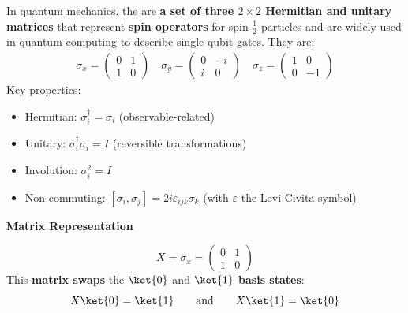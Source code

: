 \highspace
\begin{remarkbox}
   In quantum mechanics, the  are \textbf{a set of three $2 \times 2$ Hermitian and unitary matrices} that represent \textbf{spin operators} for spin-$\frac{1}{2}$ particles and are widely used in quantum computing to describe single-qubit gates. They are:
   \begin{equation*}
      \begin{array}{rcl}
         \sigma_{x} =
         \begin{pmatrix}
            0 & 1 \\
            1 & 0
         \end{pmatrix} \quad
         \sigma_{y} =
         \begin{pmatrix}
            0 & -i \\
            i & 0
         \end{pmatrix} \quad
         \sigma_{z} =
         \begin{pmatrix}
            1 & 0 \\
            0 & -1
         \end{pmatrix}
      \end{array}
   \end{equation*}
   Key properties:
   \begin{itemize}
      \item Hermitian: $\sigma_{i}^{\dagger} = \sigma_{i}$ (observable-related)
      \item Unitary: $\sigma_{i}^{\dagger} \sigma_{i} = I$ (reversible transformations)
      \item Involution: $\sigma_{i}^{2} = I$
      \item Non-commuting: $\left[\sigma_{i}, \sigma_{j}\right] = 2i \varepsilon_{ijk} \sigma_{k}$ (with $\varepsilon$ the Levi-Civita symbol)
   \end{itemize}
\end{remarkbox}

\newpage

\begin{flushleft}
   \textcolor{Green3}{ \textbf{Matrix Representation}}
\end{flushleft}
\begin{equation}
   X = \sigma_{x} =
   \begin{pmatrix}
      0 & 1 \\ 1 & 0
   \end{pmatrix}
\end{equation}
This \textbf{matrix swaps} the $\ket{0}$ and $\ket{1}$ \textbf{basis states}:
\begin{equation}
   X\ket{0} = \ket{1} \hspace{2em} \text{and} \hspace{2em} X\ket{1} = \ket{0}
\end{equation}

